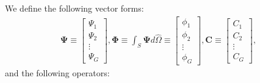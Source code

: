 We define the following vector forms:
%
\begin{gather}
  \bm{\Psi} \equiv
  \begin{bmatrix}
    \Psi_1 \\
    \Psi_2 \\
    \vdots \\
    \Psi_G
  \end{bmatrix},
  \bm{\Phi} \equiv \int_S \bm{\Psi}d\hat{\Omega} \equiv
  \begin{bmatrix}
    \phi_1 \\
    \phi_2 \\
    \vdots \\
    \phi_G
  \end{bmatrix},
  \bm{C} \equiv
  \begin{bmatrix}
    C_1 \\
    C_2 \\
    \vdots \\
    C_G
  \end{bmatrix},
\end{gather}
%
and the following operators:
%
